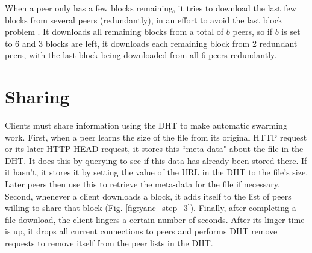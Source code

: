 When a peer only has a few blocks remaining, it tries to download the last few blocks from several peers (redundantly), in an effort to avoid the last block problem \cite{last_block}.  
It downloads all remaining blocks from a total of $b$ peers, so if $b$ is set to 6 and 3 blocks are left, it downloads each remaining block from 2 redundant peers, with the
last block being downloaded from all 6 peers redundantly.

\section{Sharing}

Clients must share information using the DHT to make automatic swarming work.  First, when a peer learns the size of the file 
from its original HTTP request or its later HTTP HEAD request, it stores this ``meta-data" about the file
in the DHT.  It does this by querying to see if this data has already been stored there.  If it hasn't, it stores it by setting the value of the URL in the DHT to the file's size. 
Later peers then use this to retrieve the meta-data for the file if necessary.
Second, whenever a client downloads a block, it adds itself to the list of peers willing to share that block (Fig. \ref{fig:yanc_step_3}). 
Finally, after completing a file download, the client lingers a certain number of seconds.  After its linger time is up, it drops all current connections to peers 
and performs DHT remove requests to remove itself from the peer lists in the DHT.

